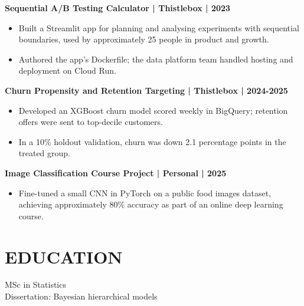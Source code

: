 \documentclass[11pt,a4paper]{article}
\newcommand{\cvsection}[1]{\section*{#1}}
\begin{document}
\textbf{Sequential A/B Testing Calculator | Thistlebox | 2023}
\begin{itemize}
\item Built a Streamlit app for planning and analysing experiments with sequential boundaries, used by approximately 25 people in product and growth.
\item Authored the app's Dockerfile; the data platform team handled hosting and deployment on Cloud Run.
\end{itemize}

\textbf{Churn Propensity and Retention Targeting | Thistlebox | 2024-2025}
\begin{itemize}
\item Developed an XGBoost churn model scored weekly in BigQuery; retention offers were sent to top-decile customers.
\item In a 10\% holdout validation, churn was down 2.1 percentage points in the treated group.
\end{itemize}

\textbf{Image Classification Course Project | Personal | 2025}
\begin{itemize}
\item Fine-tuned a small CNN in PyTorch on a public food images dataset, achieving approximately 80\% accuracy as part of an online deep learning course.
\end{itemize}

\cvsection{EDUCATION}
MSc in Statistics\\
Dissertation: Bayesian hierarchical models
\end{document}

